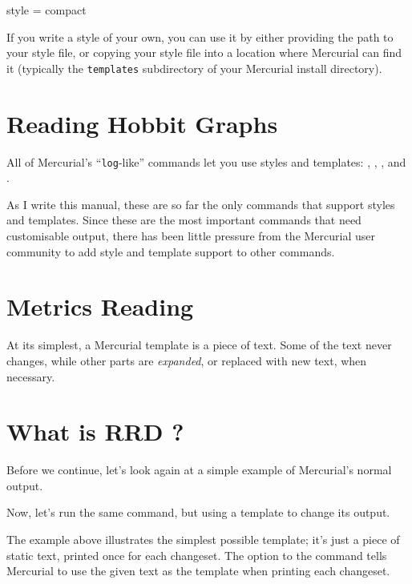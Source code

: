 \begin{codesample2}
  [ui]
  style = compact
\end{codesample2}

If you write a style of your own, you can use it by either providing
the path to your style file, or copying your style file into a
location where Mercurial can find it (typically the \texttt{templates}
subdirectory of your Mercurial install directory).

\section{Reading Hobbit Graphs}

All of Mercurial's ``\texttt{log}-like'' commands let you use styles
and templates: , , , and
.

As I write this manual, these are so far the only commands that
support styles and templates.  Since these are the most important
commands that need customisable output, there has been little pressure
from the Mercurial user community to add style and template support to
other commands.

\section{Metrics Reading }

At its simplest, a Mercurial template is a piece of text.  Some of the
text never changes, while other parts are \emph{expanded}, or replaced
with new text, when necessary.


\section{What is RRD ?}


Before we continue, let's look again at a simple example of
Mercurial's normal output.


Now, let's run the same command, but using a template to change its
output.


The example above illustrates the simplest possible template; it's
just a piece of static text, printed once for each changeset.  The
 option to the  command tells
Mercurial to use the given text as the template when printing each
changeset.

